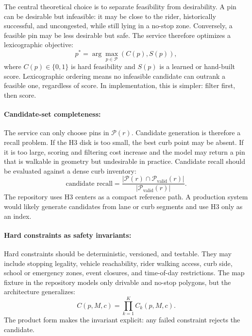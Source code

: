 \documentclass{article}
\begin{document}
The central theoretical choice is to separate feasibility from desirability. A pin can be desirable but infeasible: it may be close to the rider, historically successful, and uncongested, while still lying in a no-stop zone. Conversely, a feasible pin may be less desirable but safe. The service therefore optimizes a lexicographic objective:
\begin{equation}
  p^* = \arg\max_{p\in\mathcal{P}} \left(C(p), S(p)\right),
\end{equation}
where $C(p)\in\{0,1\}$ is hard feasibility and $S(p)$ is a learned or hand-built score. Lexicographic ordering means no infeasible candidate can outrank a feasible one, regardless of score. In implementation, this is simpler: filter first, then score.

\paragraph{Candidate-set completeness:}

The service can only choose pins in $\mathcal{P}(r)$. Candidate generation is therefore a recall problem. If the H3 disk is too small, the best curb point may be absent. If it is too large, scoring and filtering cost increase and the model may return a pin that is walkable in geometry but undesirable in practice. Candidate recall should be evaluated against a dense curb inventory:
\begin{equation}
  \text{candidate recall}=\frac{|\mathcal{P}(r)\cap \mathcal{P}_{\text{valid}}(r)|}{|\mathcal{P}_{\text{valid}}(r)|}.
\end{equation}
The repository uses H3 centers as a compact reference path. A production system would likely generate candidates from lane or curb segments and use H3 only as an index.

\paragraph{Hard constraints as safety invariants:}

Hard constraints should be deterministic, versioned, and testable. They may include stopping legality, vehicle reachability, rider walking access, curb side, school or emergency zones, event closures, and time-of-day restrictions. The map fixture in the repository models only drivable and no-stop polygons, but the architecture generalizes:
\begin{equation}
  C(p,M,c)=\prod_{k=1}^{K}C_k(p,M,c).
\end{equation}
The product form makes the invariant explicit: any failed constraint rejects the candidate.
\end{document}
